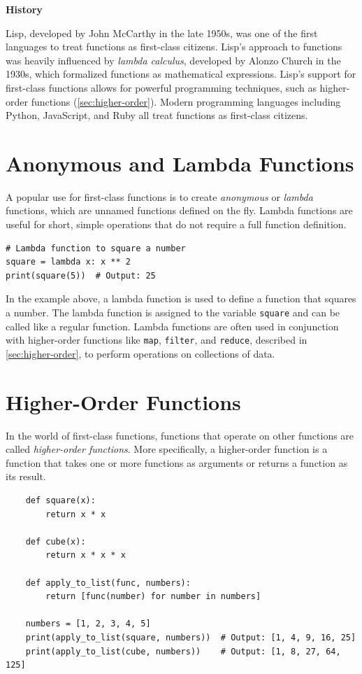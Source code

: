 \documentclass[oneside,11pt,dvipsnames]{book}
\newenvironment{historybox}[1][]{
  \small
  \begin{myhistorybox}
    {\small \textbf{#1}}
  }{
  \end{myhistorybox}
}
\newcommand{\code}[1]{\texttt{#1}}
\begin{document}
\begin{historybox}[History]
Lisp, developed by John McCarthy in the late 1950s, was one of the first languages to treat functions as first-class citizens. Lisp's approach to functions was heavily influenced by \emph{lambda calculus}, developed by Alonzo Church in the 1930s, which formalized functions as mathematical expressions. Lisp's support for first-class functions allows for powerful programming techniques, such as higher-order functions (\autoref{sec:higher-order}).  Modern programming languages including Python, JavaScript, and Ruby all treat functions as first-class citizens. 
\end{historybox}

\section{Anonymous and Lambda Functions}\label{sec:lambda}
A popular use for first-class functions is to create \emph{anonymous} or \emph{lambda} functions, which are unnamed functions defined on the fly. Lambda functions are useful for short, simple operations that do not require a full function definition. 
\begin{lstlisting}
# Lambda function to square a number
square = lambda x: x ** 2
print(square(5))  # Output: 25
\end{lstlisting}

In the example above, a lambda function is used to define a function that squares a number. The lambda function is assigned to the variable \code{square} and can be called like a regular function.
Lambda functions are often used in conjunction with higher-order functions like \code{map}, \code{filter}, and \code{reduce}, described in \autoref{sec:higher-order}, to perform operations on collections of data.

\section{Higher-Order Functions}\label{sec:higher-order}

In the world of first-class functions, functions that operate on other functions are called \emph{higher-order functions}. More specifically, a higher-order function is a function that takes one or more functions as arguments or returns a function as its result.

\begin{lstlisting}
    def square(x):
        return x * x

    def cube(x):
        return x * x * x

    def apply_to_list(func, numbers):
        return [func(number) for number in numbers]

    numbers = [1, 2, 3, 4, 5]
    print(apply_to_list(square, numbers))  # Output: [1, 4, 9, 16, 25]
    print(apply_to_list(cube, numbers))    # Output: [1, 8, 27, 64, 125]

\end{lstlisting}
\end{document}
